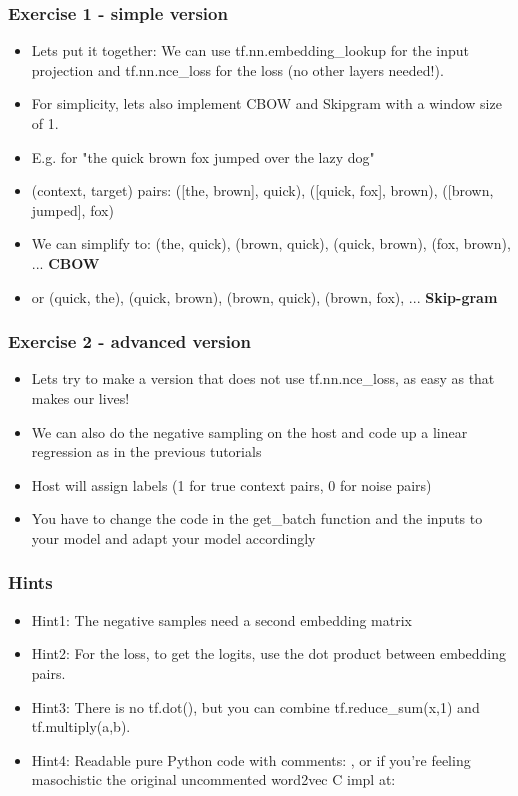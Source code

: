 \documentclass{beamer}
\begin{document}
 \begin{frame}[fragile]

  \frametitle{Exercise 1 - simple version}
   \begin{itemize}
   		\item Lets put it together: We can use tf.nn.embedding\_lookup for the input projection and tf.nn.nce\_loss for the loss (no other layers needed!).
		\item For simplicity, lets also implement CBOW and Skipgram with a window size of 1. 
		\item E.g. for "the quick brown fox jumped over the lazy dog"
		\item (context, target) pairs: ([the, brown], quick), ([quick, fox], brown), ([brown, jumped], fox)
		\item We can simplify to: (the, quick), (brown, quick), (quick, brown), (fox, brown), ... \textbf{CBOW}
		\item or (quick, the), (quick, brown), (brown, quick), (brown, fox), ... \textbf{Skip-gram}
	\end{itemize}
\end{frame}

 \begin{frame}[fragile]

  \frametitle{Exercise 2 - advanced version}
   \begin{itemize}
		\item Lets try to make a version that does not use tf.nn.nce\_loss, as easy as that makes our lives!
		\item We can also do the negative sampling on the host and code up a linear regression as in the previous tutorials
		\item Host will assign labels (1 for true context pairs, 0 for noise pairs)
		\item You have to change the code in the get\_batch function and the inputs to your model and adapt your model accordingly		
	\end{itemize}
\end{frame}

 \begin{frame}[fragile]
 
 \frametitle{Hints}
  \begin{itemize}
		\item Hint1: The negative samples need a second embedding matrix
		\item Hint2: For the loss, to get the logits, use the dot product between embedding pairs.
		\item Hint3: There is no tf.dot(), but you can combine tf.reduce\_sum(x,1) and tf.multiply(a,b).
		\item Hint4: Readable pure Python code with comments: , or if you're feeling masochistic the original uncommented word2vec C impl at: 
	\end{itemize}
		
\end{frame}
\end{document}
